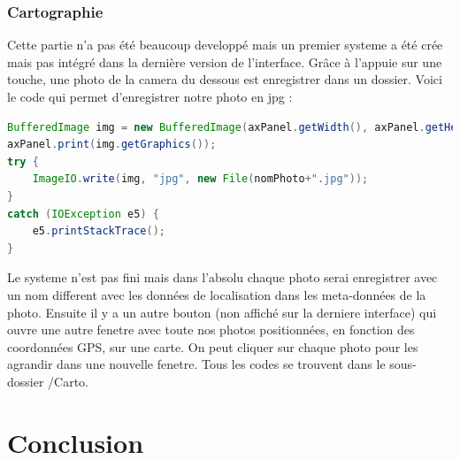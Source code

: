 \documentclass[a4paper,11pt]{report}
\begin{document}
		\subsection{Cartographie}
			\label{subsec:Cartographie}
			Cette partie n'a pas été beaucoup developpé mais un premier systeme a été crée mais pas intégré dans la dernière version de l'interface.
			\newline Grâce à l'appuie sur une touche, une photo de la camera du dessous est enregistrer dans un dossier. Voici le code qui permet d'enregistrer notre photo en jpg :
			\begin{lstlisting}[language=java]
BufferedImage img = new BufferedImage(axPanel.getWidth(), axPanel.getHeight(), BufferedImage.TYPE_INT_RGB);
axPanel.print(img.getGraphics());
try {
	ImageIO.write(img, "jpg", new File(nomPhoto+".jpg"));
}
catch (IOException e5) {
	e5.printStackTrace();
}
		\end{lstlisting}
			Le systeme n'est pas fini mais dans l'absolu chaque photo serai enregistrer avec un nom different avec les données de localisation dans les meta-données de la photo.
			\newline Ensuite il y a un autre bouton (non affiché sur la derniere interface) qui ouvre une autre fenetre avec toute nos photos positionnées, en fonction des coordonnées GPS, sur une carte.
			\newline On peut cliquer sur chaque photo pour les agrandir dans une nouvelle fenetre.
			\newline Tous les codes se trouvent dans le sous-dossier /Carto.
			
\chapter{Conclusion}


 



\listoffigures
				
\end{document}
